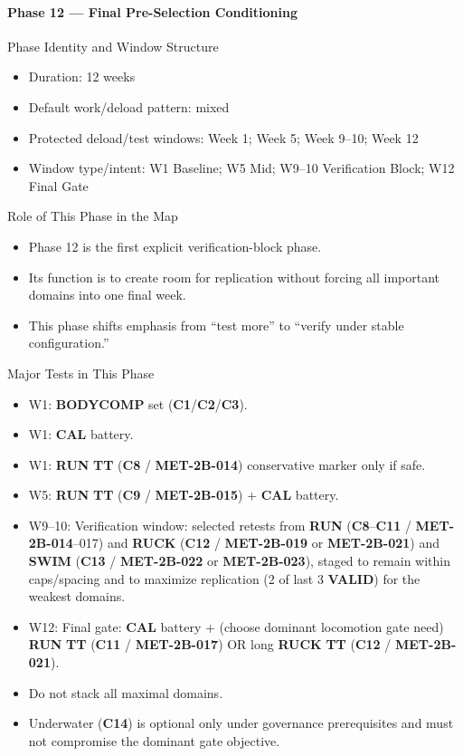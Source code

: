 \documentclass[10pt]{article}
\begin{document}
\newpage
\paragraph*{Phase 12 — Final Pre-Selection Conditioning}

Phase Identity and Window Structure

\begin{itemize}
\item Duration: 12 weeks
\item Default work/deload pattern: mixed
\item Protected deload/test windows: Week 1; Week 5; Week 9–10; Week 12
\item Window type/intent: W1 Baseline; W5 Mid; W9–10 Verification Block; W12 Final Gate
\end{itemize}

Role of This Phase in the Map

\begin{itemize}
\item Phase 12 is the first explicit verification-block phase.
\item Its function is to create room for replication without forcing all important domains into one final week.
\item This phase shifts emphasis from “test more” to “verify under stable configuration.”
\end{itemize}

Major Tests in This Phase

\begin{itemize}
\item W1: \textbf{BODYCOMP} set (\textbf{C1}/\textbf{C2}/\textbf{C3}).
\item W1: \textbf{CAL} battery.
\item W1: \textbf{RUN} \textbf{TT} (\textbf{C8} / \textbf{MET-2B-014}) conservative marker only if safe.
\item W5: \textbf{RUN} \textbf{TT} (\textbf{C9} / \textbf{MET-2B-015}) + \textbf{CAL} battery.
\item W9–10: Verification window: selected retests from \textbf{RUN} (\textbf{C8}–\textbf{C11} / \textbf{MET-2B-014}–017) and \textbf{RUCK} (\textbf{C12} / \textbf{MET-2B-019} or \textbf{MET-2B-021}) and \textbf{SWIM} (\textbf{C13} / \textbf{MET-2B-022} or \textbf{MET-2B-023}), staged to remain within caps/spacing and to maximize replication (2 of last 3 \textbf{VALID}) for the weakest domains.
\item W12: Final gate: \textbf{CAL} battery + (choose dominant locomotion gate need) \textbf{RUN} \textbf{TT} (\textbf{C11} / \textbf{MET-2B-017}) OR long \textbf{RUCK} \textbf{TT} (\textbf{C12} / \textbf{MET-2B-021}).
\item Do not stack all maximal domains.
\item Underwater (\textbf{C14}) is optional only under governance prerequisites and must not compromise the dominant gate objective.
\end{itemize}
\end{document}
